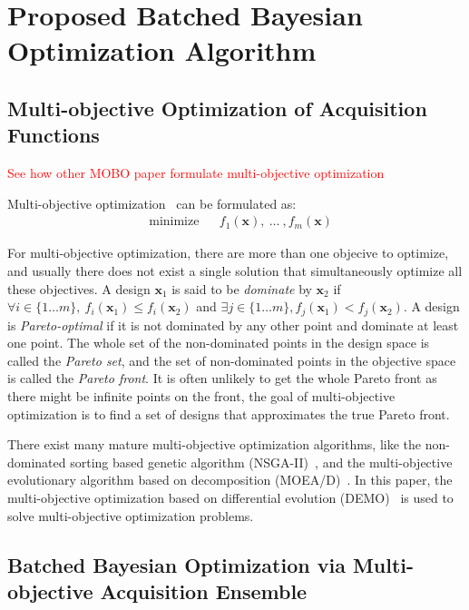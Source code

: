 \section{Proposed Batched Bayesian Optimization Algorithm}

\subsection{Multi-objective Optimization of Acquisition Functions}\label{sec:MOForumlation}

\textcolor{red}{See how other MOBO paper formulate multi-objective optimization}

Multi-objective optimization~\cite{MO_overview} can be formulated as:
\begin{equation}
    \label{eq:MOFormulation}
    \begin{aligned}
        & \text{minimize} & & f_1(\bm{x}),~\dots~,f_m(\bm{x})
    \end{aligned}
\end{equation}

For multi-objective optimization, there are more than one objecive to optimize, and usually there does not exist a single solution that simultaneously optimize all these objectives. A design $\bm{x}_1$ is said to be \emph{dominate} by $\bm{x}_2$ if $\forall i \in \{1\dots m\},~f_i(\bm{x}_1) \le f_i(\bm{x}_2)$ and $\exists j \in \{1\dots m\}, f_j(\bm{x}_1) < f_j(\bm{x}_2)$. A design is \emph{Pareto-optimal} if it is not dominated by any other point and dominate at least one point. The whole set of the non-dominated points in the design space is called the \emph{Pareto set}, and the set of non-dominated points in the objective space is called the \emph{Pareto front}. It is often unlikely to get the whole Pareto front as there might be infinite points on the front, the goal of multi-objective optimization is to find a set of designs that approximates the true Pareto front.

There exist many mature multi-objective optimization algorithms, like the non-dominated sorting based genetic algorithm (NSGA-II)~\cite{nsgaii}, and the multi-objective evolutionary algorithm based on decomposition (MOEA/D)~\cite{moead}. In this paper, the multi-objective optimization based on differential evolution (DEMO)~\cite{demo} is used to solve multi-objective optimization problems.



\subsection{Batched Bayesian Optimization via Multi-objective Acquisition Ensemble}

